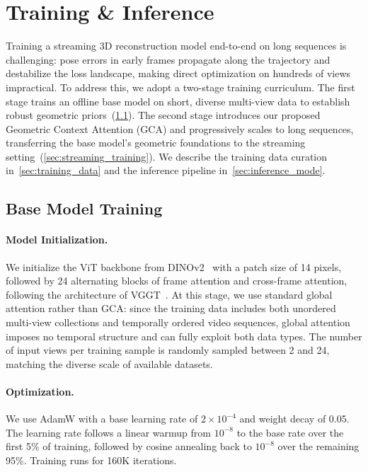 \section{Training \& Inference}
\label{sec:training}

Training a streaming 3D reconstruction model end-to-end on long sequences is
challenging: pose errors in early frames propagate along the trajectory and
destabilize the loss landscape, making direct optimization on hundreds of views
impractical.
To address this, we adopt a two-stage training curriculum.
The first stage trains an offline base model on short, diverse multi-view data
to establish robust geometric priors~(\cref{sec:base_training}).
The second stage introduces our proposed Geometric Context Attention (GCA) and
progressively scales to long sequences, transferring the base model's
geometric foundations to the streaming setting~(\cref{sec:streaming_training}).
We describe the training data curation in~\cref{sec:training_data} and
the inference pipeline in~\cref{sec:inference_mode}.


\subsection{Base Model Training}
\label{sec:base_training}

\paragraph{Model Initialization.}
We initialize the ViT backbone from DINOv2~\cite{oquab2023dinov2} 
with a patch size of 14 pixels, followed by 24 alternating blocks of
frame attention and cross-frame attention, following the architecture
of VGGT~\cite{wang2025vggt}.
At this stage, we use standard global attention rather than GCA:
since the training data includes both unordered multi-view collections and
temporally ordered video sequences, global attention imposes no temporal
structure and can fully exploit both data types.
The number of input views per training sample is randomly sampled between
2 and 24, matching the diverse scale of available datasets.

\paragraph{Optimization.}
We use AdamW with a base learning rate of $2 \times 10^{-4}$ and weight
decay of 0.05.
The learning rate follows a linear warmup from $10^{-8}$ to the base rate
over the first 5\% of training, followed by cosine annealing back to
$10^{-8}$ over the remaining 95\%.
Training runs for 160K iterations.

